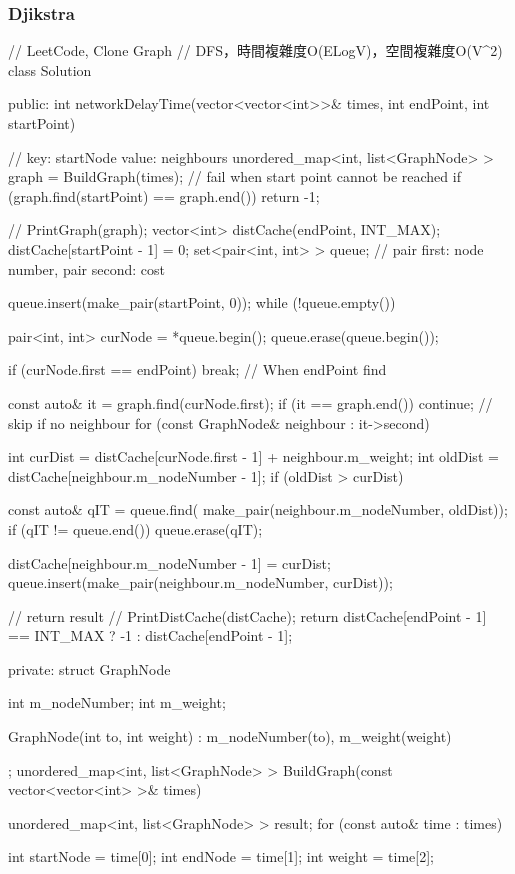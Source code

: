 \subsubsection{Djikstra}
\begin{Code}
// LeetCode, Clone Graph
// DFS，時間複雜度O(ELogV)，空間複雜度O(V^2)
class Solution {
public:
int networkDelayTime(vector<vector<int>>& times, int endPoint, int startPoint)
    {
        // key: startNode value: neighbours
        unordered_map<int, list<GraphNode> > graph = BuildGraph(times);
        // fail when start point cannot be reached
        if (graph.find(startPoint) == graph.end()) return -1;
        
        // PrintGraph(graph);
        vector<int> distCache(endPoint, INT_MAX); distCache[startPoint - 1] = 0;
        set<pair<int, int> > queue; // pair first: node number, pair second: cost

        queue.insert(make_pair(startPoint, 0));
        while (!queue.empty())
        {
            pair<int, int> curNode = *queue.begin();
            queue.erase(queue.begin());

            if (curNode.first == endPoint) break; // When endPoint find

            const auto& it = graph.find(curNode.first);
            if (it == graph.end()) continue; // skip if no neighbour
            for (const GraphNode& neighbour : it->second)
            {
                int curDist = distCache[curNode.first - 1] + neighbour.m_weight;
                int oldDist = distCache[neighbour.m_nodeNumber - 1];
                if (oldDist > curDist)
                {
                    const auto& qIT = queue.find(
                                    make_pair(neighbour.m_nodeNumber, oldDist));
                    if (qIT != queue.end())
                        queue.erase(qIT);

                    distCache[neighbour.m_nodeNumber - 1] = curDist;
                    queue.insert(make_pair(neighbour.m_nodeNumber, curDist));
                }
            }
        }
        // return result
        // PrintDistCache(distCache);
        return distCache[endPoint - 1] == INT_MAX ? -1 : distCache[endPoint - 1];
    }
private:
    struct GraphNode
    {
        int m_nodeNumber;
        int m_weight;

        GraphNode(int to, int weight)
            : m_nodeNumber(to), m_weight(weight)
        {
        }
    };
    unordered_map<int, list<GraphNode> > BuildGraph(const vector<vector<int> >& times)
    {
        unordered_map<int, list<GraphNode> > result;
        for (const auto& time : times)
        {
            int startNode = time[0];
            int endNode = time[1];
            int weight = time[2];

}}}
\end{Code}
